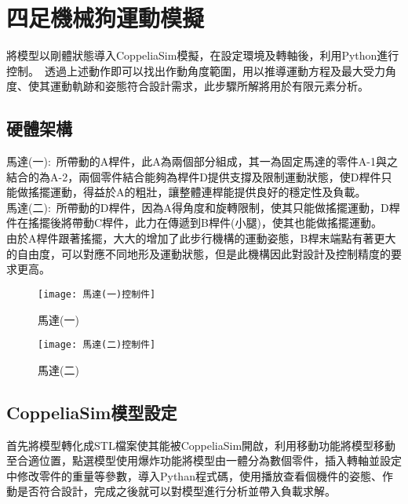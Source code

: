 \chapter{四足機械狗運動模擬}
將模型以剛體狀態導入CoppeliaSim模擬，在設定環境及轉軸後，利用Python進行控制。\
透過上述動作即可以找出作動角度範圍，用以推導運動方程及最大受力角度、使其運動軌跡和姿態符合設計需求，此步驟所解將用於有限元素分析。\\

\section{硬體架構}
馬達(一):\
所帶動的A桿件，此A為兩個部分組成，其一為固定馬達的零件A-1與之結合的為A-2，兩個零件結合能夠為桿件D提供支撐及限制運動狀態，使D桿件只能做搖擺運動，得益於A的粗壯，讓整體連桿能提供良好的穩定性及負載。\\
馬達(二):\
所帶動的D桿件，因為A得角度和旋轉限制，使其只能做搖擺運動，D桿件在搖擺後將帶動C桿件，此力在傳遞到B桿件(小腿)，使其也能做搖擺運動。\\
由於A桿件跟著搖擺，大大的增加了此步行機構的運動姿態，B桿末端點有著更大的自由度，可以對應不同地形及運動狀態，但是此機構因此對設計及控制精度的要求更高。\\

\begin{figure}[htbp]
  \begin{minipage}[t]{0.5\linewidth}
    \centering
    \texttt{[image: 馬達(一)控制件]}
    \caption{馬達(一)}
    \label{馬達(一)控制件}
  \end{minipage}
  \hfill
  \begin{minipage}[t]{0.5\linewidth}
    \centering
    \texttt{[image: 馬達(二)控制件]}
    \caption{馬達(二)}
    \label{馬達(二)控制件}
  \end{minipage}
\end{figure}

\section{CoppeliaSim模型設定}
首先將模型轉化成STL檔案使其能被CoppeliaSim開啟，利用移動功能將模型移動至合適位置，點選模型使用爆炸功能將模型由一體分為數個零件，插入轉軸並設定中修改零件的重量等參數，導入Pythan程式碼，使用播放查看個機件的姿態、作動是否符合設計，完成之後就可以對模型進行分析並帶入負載求解。\


